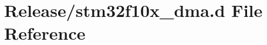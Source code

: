 \hypertarget{stm32f10x__dma_8d}{}\section{Release/stm32f10x\+\_\+dma.d File Reference}
\label{stm32f10x__dma_8d}
